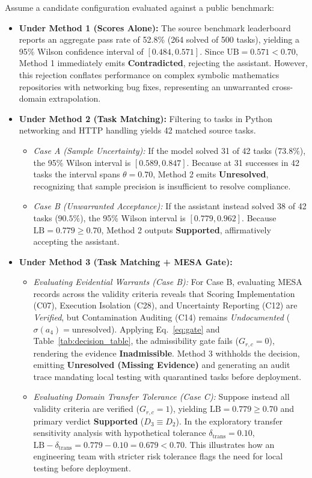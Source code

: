 \documentclass[runningheads]{llncs}
\begin{document}
Assume a candidate configuration evaluated against a public benchmark:
\begin{itemize}[leftmargin=*]
    \item \textbf{Under Method 1 (Scores Alone):} The source benchmark leaderboard reports an aggregate pass rate of 52.8\% (264 solved of 500 tasks), yielding a 95\% Wilson confidence interval of $[0.484, 0.571]$. Since $\text{UB} = 0.571 < 0.70$, Method 1 immediately emits \textbf{Contradicted}, rejecting the assistant. However, this rejection conflates performance on complex symbolic mathematics repositories with networking bug fixes, representing an unwarranted cross-domain extrapolation.
    \item \textbf{Under Method 2 (Task Matching):} Filtering to tasks in Python networking and HTTP handling yields 42 matched source tasks.
    \begin{itemize}
        \item \emph{Case A (Sample Uncertainty):} If the model solved 31 of 42 tasks ($73.8\%$), the 95\% Wilson interval is $[0.589, 0.847]$. Because at 31 successes in 42 tasks the interval spans $\theta = 0.70$, Method 2 emits \textbf{Unresolved}, recognizing that sample precision is insufficient to resolve compliance.
        \item \emph{Case B (Unwarranted Acceptance):} If the assistant instead solved 38 of 42 tasks ($90.5\%$), the 95\% Wilson interval is $[0.779, 0.962]$. Because $\text{LB} = 0.779 \ge 0.70$, Method 2 outputs \textbf{Supported}, affirmatively accepting the assistant.
    \end{itemize}
    \item \textbf{Under Method 3 (Task Matching + MESA Gate):}
    \begin{itemize}
        \item \emph{Evaluating Evidential Warrants (Case B):} For Case B, evaluating MESA records across the validity criteria reveals that Scoring Implementation (C07), Execution Isolation (C28), and Uncertainty Reporting (C12) are \emph{Verified}, but Contamination Auditing (C14) remains \emph{Undocumented} ($\sigma(a_4) = \text{unresolved}$). Applying Eq.~\ref{eq:gate} and Table~\ref{tab:decision_table}, the admissibility gate fails ($G_{r,c} = 0$), rendering the evidence \textbf{Inadmissible}. Method 3 withholds the decision, emitting \textbf{Unresolved (Missing Evidence)} and generating an audit trace mandating local testing with quarantined tasks before deployment.
        \item \emph{Evaluating Domain Transfer Tolerance (Case C):} Suppose instead all validity criteria are verified ($G_{r,c} = 1$), yielding $\text{LB} = 0.779 \ge 0.70$ and primary verdict \textbf{Supported} ($D_3 \equiv D_2$). In the exploratory transfer sensitivity analysis with hypothetical tolerance $\delta_{\text{trans}} = 0.10$, $\text{LB} - \delta_{\text{trans}} = 0.779 - 0.10 = 0.679 < 0.70$. This illustrates how an engineering team with stricter risk tolerance flags the need for local testing before deployment.
    \end{itemize}
\end{itemize}
\end{document}
